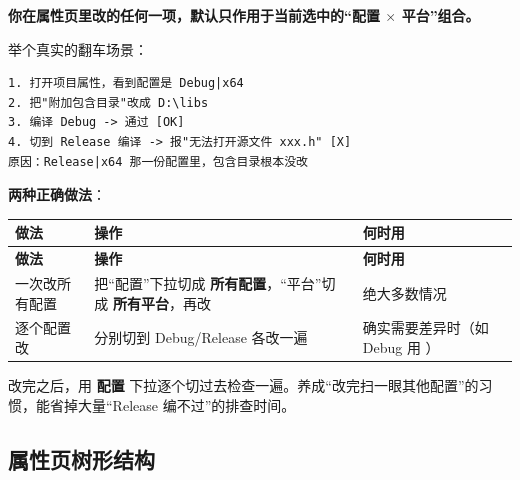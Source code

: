 \textbf{你在属性页里改的任何一项，默认只作用于当前选中的“配置 $\times$ 平台”组合。}

举个真实的翻车场景：

\begin{lstlisting}[style=textstyle, breaklines=true]
1. 打开项目属性，看到配置是 Debug|x64
2. 把"附加包含目录"改成 D:\libs
3. 编译 Debug -> 通过 [OK]
4. 切到 Release 编译 -> 报"无法打开源文件 xxx.h" [X]
原因：Release|x64 那一份配置里，包含目录根本没改
\end{lstlisting}

\textbf{两种正确做法}：

\begin{longtable}{L{3.0cm}L{8.6cm}L{3.0cm}}
\toprule
\textbf{做法} & \textbf{操作} & \textbf{何时用} \\
\midrule
\endfirsthead
\toprule
\textbf{做法} & \textbf{操作} & \textbf{何时用} \\
\midrule
\endhead
\bottomrule
\endlastfoot
一次改所有配置 & 把“配置”下拉切成 \textbf{所有配置}，“平台”切成 \textbf{所有平台}，再改 & 绝大多数情况 \\
逐个配置改 & 分别切到 Debug/Release 各改一遍 & 确实需要差异时（如 Debug 用 ） \\
\end{longtable}

\begin{tipbox}[提示]
改完之后，用 \textbf{配置} 下拉逐个切过去检查一遍。养成“改完扫一眼其他配置”的习惯，能省掉大量“Release 编不过”的排查时间。
\end{tipbox}

\subsection{属性页树形结构}

